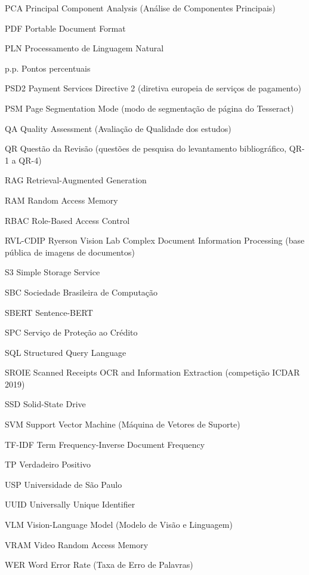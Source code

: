 \begin{siglas}
	\item[PCA] Principal Component Analysis (Análise de Componentes Principais)
	\item[PDF] Portable Document Format
	\item[PLN] Processamento de Linguagem Natural
	\item[p.p.] Pontos percentuais
	\item[PSD2] Payment Services Directive 2 (diretiva europeia de serviços de pagamento)
	\item[PSM] Page Segmentation Mode (modo de segmentação de página do Tesseract)
	\item[QA] Quality Assessment (Avaliação de Qualidade dos estudos)
	\item[QR] Questão da Revisão (questões de pesquisa do levantamento bibliográfico, QR-1 a QR-4)
	\item[RAG] Retrieval-Augmented Generation
	\item[RAM] Random Access Memory
	\item[RBAC] Role-Based Access Control
	\item[RVL-CDIP] Ryerson Vision Lab Complex Document Information Processing (base pública de imagens de documentos)
	\item[S3] Simple Storage Service
	\item[SBC] Sociedade Brasileira de Computação
	\item[SBERT] Sentence-BERT
	\item[SPC] Serviço de Proteção ao Crédito
	\item[SQL] Structured Query Language
	\item[SROIE] Scanned Receipts OCR and Information Extraction (competição ICDAR 2019)
	\item[SSD] Solid-State Drive
	\item[SVM] Support Vector Machine (Máquina de Vetores de Suporte)
	\item[TF-IDF] Term Frequency-Inverse Document Frequency
	\item[TP] Verdadeiro Positivo
	\item[USP] Universidade de São Paulo
	\item[UUID] Universally Unique Identifier
	\item[VLM] Vision-Language Model (Modelo de Visão e Linguagem)
	\item[VRAM] Video Random Access Memory
	\item[WER] Word Error Rate (Taxa de Erro de Palavras)
\end{siglas}
